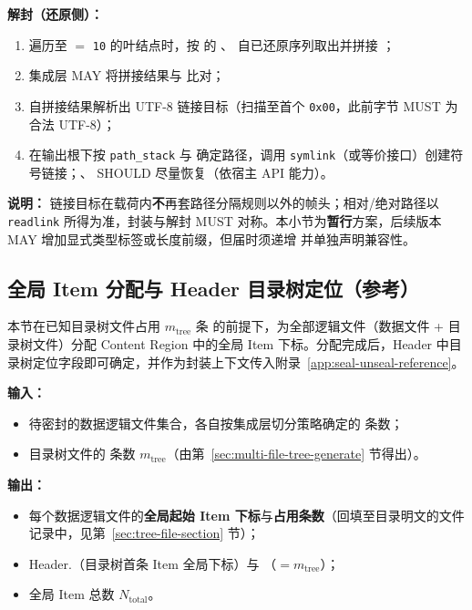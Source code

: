\textbf{解封（还原侧）：}
\begin{enumerate}
  \item 遍历至  $=$ \texttt{10} 的叶结点时，按  的 、 自已还原序列取出并拼接 ；
  \item 集成层 MAY 将拼接结果与  比对；
  \item 自拼接结果解析出 UTF-8 链接目标（扫描至首个 \texttt{0x00}，此前字节 MUST 为合法 UTF-8）；
  \item 在输出根下按 \texttt{path\_stack} 与  确定路径，调用 \texttt{symlink}（或等价接口）创建符号链接；、 SHOULD 尽量恢复（依宿主 API 能力）。
\end{enumerate}

\textbf{说明：}
链接目标在载荷内\textbf{不}再套路径分隔规则以外的帧头；相对/绝对路径以 \texttt{readlink} 所得为准，封装与解封 MUST 对称。本小节为\textbf{暂行}方案，后续版本 MAY 增加显式类型标签或长度前缀，但届时须递增  并单独声明兼容性。

\subsection{全局 Item 分配与 Header 目录树定位（参考）}\label{sec:multi-file-item-alloc}
\label{sec:directory-tree-binding}

本节在已知目录树文件占用 $m_{\mathrm{tree}}$ 条  的前提下，为全部逻辑文件（数据文件 + 目录树文件）分配 Content Region 中的全局 Item 下标。分配完成后，Header 中目录树定位字段即可确定，并作为封装上下文传入附录~\ref{app:seal-unseal-reference}。

\textbf{输入：}
\begin{itemize}
  \item 待密封的数据逻辑文件集合，各自按集成层切分策略确定的  条数；
  \item 目录树文件的  条数 $m_{\mathrm{tree}}$（由第~\ref{sec:multi-file-tree-generate} 节得出）。
\end{itemize}

\textbf{输出：}
\begin{itemize}
  \item 每个数据逻辑文件的\textbf{全局起始 Item 下标}与\textbf{占用条数}（回填至目录明文的文件记录中，见第~\ref{sec:tree-file-section} 节）；
  \item Header.（目录树首条 Item 全局下标）与 （$= m_{\mathrm{tree}}$）；
  \item 全局 Item 总数 $N_{\mathrm{total}}$。
\end{itemize}

